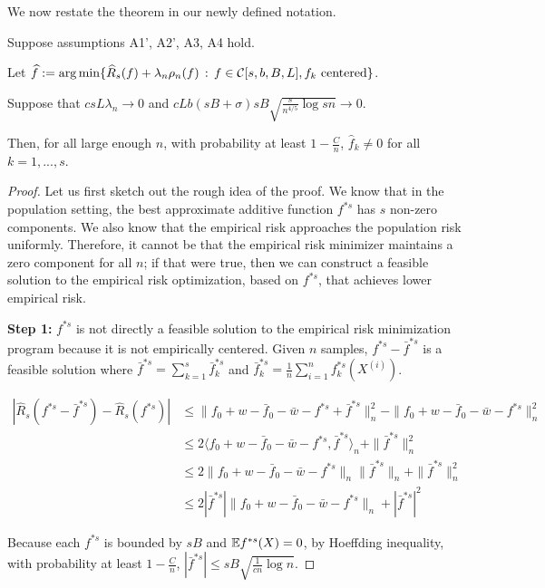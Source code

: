 We now restate the theorem in our newly defined notation.
 
\begin{theorem} 
Suppose assumptions A1', A2', A3, A4 hold. 

Let $\displaystyle \widehat{f} := \arg\min \{ \widehat{R}_s(f) + \lambda_n \rho_n(f) \,:\, f \in \mathcal{C}[s,b,B,L], f_k \textrm{ centered} \}$.

Suppose that $c s L \lambda_n \rightarrow 0$ and $c L b (sB+\sigma)sB \sqrt{\frac{s}{n^{4/5}} \log sn} \rightarrow 0$.

Then, for all large enough $n$, with probability at least $1-\frac{C}{n}$, $\hat{f}_k \neq 0$ for all $k =1,...,s$.
\end{theorem}

\begin{proof}
Let us first sketch out the rough idea of the proof. We know that in the population setting, the best approximate additive function $f^{*s}$ has $s$ non-zero components. We also know that the empirical risk approaches the population risk uniformly. Therefore, it cannot be that the empirical risk minimizer maintains a zero component for all $n$; if that were true, then we can construct a feasible solution to the empirical risk optimization, based on $f^{*s}$, that achieves lower empirical risk. 


\textbf{Step 1:} $f^{*s}$ is not directly a feasible solution to the empirical risk minimization program because it is not empirically centered. Given $n$ samples, $f^{*s} - \bar{f}^{*s}$ is a feasible solution where $\bar{f}^{*s} = \sum_{k=1}^s \bar{f}_k^{*s}$ and $\bar{f}_k^{*s} = \frac{1}{n} \sum_{i=1}^n f_k^{*s}(X^{(i)})$. 

\begin{align*}
|\hat{R}_s(f^{*s} - \bar{f}^{*s}) - \hat{R}_s(f^{*s})| &\leq 
         \| f_0 + w - \bar{f}_0 - \bar{w}
         - f^{*s} + \bar{f}^{*s} \|_n^2  - \| f_0 + w - \bar{f}_0 - \bar{w} - f^{*s}\|_n^2 \\
   &\leq 2 \langle f_0 + w - \bar{f}_0 - \bar{w} - f^{*s}, \bar{f}^{*s} \rangle_n 
         + \| \bar{f}^{*s} \|_n^2 \\
   &\leq 2\| f_0 + w - \bar{f}_0 - \bar{w} -f^{*s}\|_n 
                \|\bar{f}^{*s} \|_n 
                  + \|\bar{f}^{*s} \|_n^2 \\
   &\leq 2 | \bar{f}^{*s} | \| f_0 + w 
           - \bar{f}_0 - \bar{w} - f^{*s} \|_n + |\bar{f}^{*s}|^2 
\end{align*}

Because each $f^{*s}$ is bounded by $sB$ and ${\mathbb E} f^{*s}(X) = 0$, by Hoeffding inequality, with probability at least $1-\frac{C}{n}$, $|\bar{f}^{*s}| \leq sB \sqrt{\frac{1}{cn} \log n}$. 


\end{proof}
